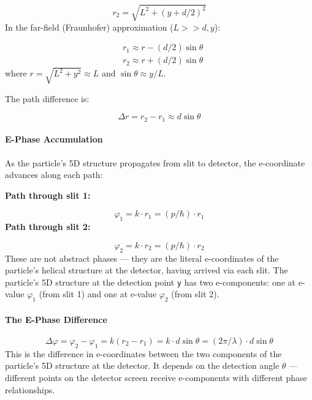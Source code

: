 \documentclass[aps,prd,preprint,superscriptaddress,longbibliography,floatfix]{revtex4-2}
\theoremstyle{remark}
\begin{document}
\begin{equation}
    r_{2} = \sqrt{L^{2} + (y + d/2)^{2}}
\end{equation}
In the far-field (Fraunhofer) approximation ($L >> d, y$):


\begin{align}
    & r_{1} \approx r - (d/2) \sin \theta \\
    & r_{2} \approx r + (d/2) \sin \theta
\end{align}
where $r = \sqrt{L^{2} + y^{2}} \approx L$ and $\sin \theta \approx y/L$.

The path difference is:


\begin{equation}
    \Delta r = r_{2} - r_{1} \approx d \sin \theta
\end{equation}

\paragraph{E-Phase Accumulation}

As the particle's 5D structure propagates from slit to detector, the e-coordinate advances along each path:

\textbf{Path through slit 1:}


\begin{equation}
    \varphi_{1} = k \cdot r_{1} = (p/\hbar) \cdot r_{1}
\end{equation}
\textbf{Path through slit 2:}


\begin{equation}
    \varphi_{2} = k \cdot r_{2} = (p/\hbar) \cdot r_{2}
\end{equation}
These are not abstract phases --- they are the literal e-coordinates of the particle's helical structure at the detector, having arrived via each slit. The particle's 5D structure at the detection point \texttt{y} has two e-components: one at e-value $\varphi_{1}$ (from slit 1) and one at e-value $\varphi_{2}$ (from slit 2).


\paragraph{The E-Phase Difference}


\begin{equation}
    \Delta\varphi = \varphi_{2} - \varphi_{1} = k(r_{2} - r_{1}) = k \cdot d \sin \theta = (2\pi/\lambda) \cdot d \sin \theta
\end{equation}
This is the difference in e-coordinates between the two components of the particle's 5D structure at the detector. It depends on the detection angle $\theta$ --- different points on the detector screen receive e-components with different phase relationships.
\end{document}

